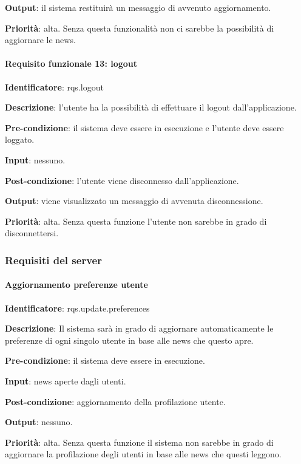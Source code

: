 \documentclass[12pt]{article}
\begin{document}
\textbf{Output}: il sistema restituirà un messaggio di avvenuto aggiornamento.

\textbf{Priorità}: alta. Senza questa funzionalità non ci sarebbe la possibilità di aggiornare le news.

\paragraph{Requisito funzionale 13: logout}

\textbf{Identificatore}: rqs.logout

\textbf{Descrizione}: l'utente ha la possibilità di effettuare il logout dall'applicazione.

\textbf{Pre-condizione}: il sistema deve essere in esecuzione e l'utente deve essere loggato.

\textbf{Input}: nessuno.

\textbf{Post-condizione}: l'utente viene disconnesso dall'applicazione.

\textbf{Output}: viene visualizzato un messaggio di avvenuta disconnessione.

\textbf{Priorità}: alta. Senza questa funzione l'utente non sarebbe in grado di disconnettersi.

\subsubsection{Requisiti del server}

\paragraph{Aggiornamento preferenze utente}

\textbf{Identificatore}: rqs.update.preferences

\textbf{Descrizione}: Il sistema sarà in grado di aggiornare automaticamente le preferenze di ogni singolo utente in base alle news che questo apre.

\textbf{Pre-condizione}: il sistema deve essere in esecuzione.

\textbf{Input}: news aperte dagli utenti.

\textbf{Post-condizione}: aggiornamento della profilazione utente.

\textbf{Output}: nessuno.

\textbf{Priorità}: alta. Senza questa funzione il sistema non sarebbe in grado di aggiornare la profilazione degli utenti in base alle news che questi leggono.
\end{document}
